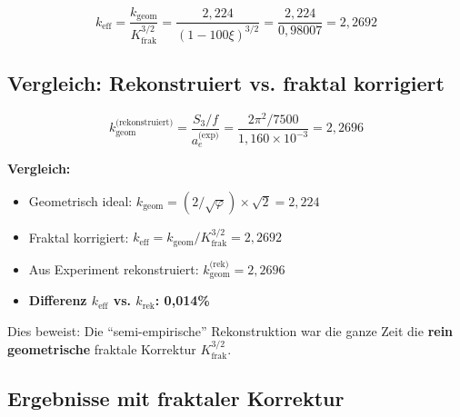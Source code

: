	\begin{equation}
		\boxed{k_\text{eff} = \frac{k_\text{geom}}{K_\text{frak}^{3/2}} = \frac{2{,}224}{(1-100\xi)^{3/2}} = \frac{2{,}224}{0{,}98007} = 2{,}2692}
	\end{equation}
	
	\subsection{Vergleich: Rekonstruiert vs. fraktal korrigiert}
	
	\begin{equation}
		k_{\text{geom}}^{\text{(rekonstruiert)}} = \frac{S_3/f}{a_e^{\text{(exp)}}} = \frac{2\pi^2 / 7500}{1{,}160 \times 10^{-3}} = 2{,}2696
	\end{equation}
	
	\textbf{Vergleich:}
	\begin{itemize}
		\item Geometrisch ideal: $k_{\text{geom}} = (2/\sqrt{\varphi}) \times \sqrt{2} = 2{,}224$
		\item Fraktal korrigiert: $k_{\text{eff}} = k_{\text{geom}} / K_\text{frak}^{3/2} = 2{,}2692$
		\item Aus Experiment rekonstruiert: $k_{\text{geom}}^{\text{(rek)}} = 2{,}2696$
		\item \textbf{Differenz $k_\text{eff}$ vs. $k_\text{rek}$: 0{,}014\%}
	\end{itemize}
	
	Dies beweist: Die \enquote{semi-empirische} Rekonstruktion war die ganze Zeit die \textbf{rein geometrische} fraktale Korrektur $K_\text{frak}^{3/2}$.
	
	\subsection{Ergebnisse mit fraktaler Korrektur}
	
	\begin{table}[h]
		\centering
		\caption{Absolutwerte mit geometrischem vs. fraktal korrigiertem $k_\text{eff}$}
	\end{table}
	
